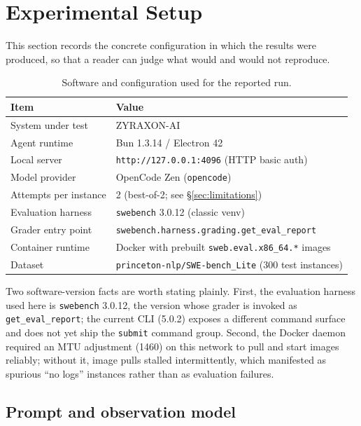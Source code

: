 \documentclass[11pt,a4paper]{article}
\begin{document}
\section{Experimental Setup}
\label{sec:setup}

This section records the concrete configuration in which the results were
produced, so that a reader can judge what would and would not reproduce.

\begin{table}[H]
\centering
\caption{Software and configuration used for the reported run.}
\label{tab:setup}
\begin{tabular}{@{}ll@{}}
\toprule
Item & Value \\
\midrule
System under test & ZYRAXON-AI \\
Agent runtime & Bun 1.3.14 / Electron 42 \\
Local server & \texttt{http://127.0.0.1:4096} (HTTP basic auth) \\
Model provider & OpenCode Zen (\texttt{opencode}) \\
Attempts per instance & 2 (best-of-2; see \S\ref{sec:limitations}) \\
Evaluation harness & \texttt{swebench} 3.0.12 (classic venv) \\
Grader entry point & \texttt{swebench.harness.grading.get\_eval\_report} \\
Container runtime & Docker with prebuilt \texttt{sweb.eval.x86\_64.*} images \\
Dataset & \texttt{princeton-nlp/SWE-bench\_Lite} (300 test instances) \\
\bottomrule
\end{tabular}
\end{table}

Two software-version facts are worth stating plainly. First, the evaluation harness
used here is \texttt{swebench} 3.0.12, the version whose grader is invoked as
\texttt{get\_eval\_report}; the current CLI (5.0.2) exposes a different command surface
and does not yet ship the \texttt{submit} command group. Second, the Docker daemon
required an MTU adjustment (1460) on this network to pull and start images reliably;
without it, image pulls stalled intermittently, which manifested as spurious ``no logs''
instances rather than as evaluation failures.

\subsection{Prompt and observation model}
\end{document}
